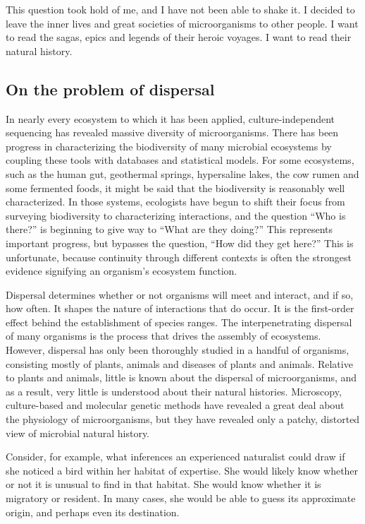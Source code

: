 This question took hold of me, and I have not been able to shake it. I decided to leave the inner lives and great societies of microorganisms to other people. I want to read the sagas, epics and legends of their heroic voyages. I want to read their natural history.

\subsection*{On the problem of dispersal}

In nearly every ecosystem to which it has been applied, culture-independent sequencing has revealed massive diversity of microorganisms. There has been progress in characterizing the biodiversity of many microbial ecosystems by coupling these tools with databases and statistical models. For some ecosystems, such as the human gut, geothermal springs, hypersaline lakes, the cow rumen and some fermented foods, it might be said that the biodiversity is reasonably well characterized. In those systems, ecologists have begun to shift their focus from surveying biodiversity to characterizing interactions, and the question ``Who is there?'' is beginning to give way to ``What are they doing?'' This represents important progress, but bypasses the question, ``How did they get here?'' This is unfortunate, because continuity through different contexts is often the strongest evidence signifying an organism's ecosystem function.

Dispersal determines whether or not organisms will meet and interact, and if so, how often. It shapes the nature of interactions that do occur. It is the first-order effect behind the establishment of species ranges. The interpenetrating dispersal of many organisms is the process that drives the assembly of ecosystems. However, dispersal has only been thoroughly studied in a handful of organisms, consisting mostly of plants, animals and diseases of plants and animals. Relative to plants and animals, little is known about the dispersal of microorganisms, and as a result, very little is understood about their natural histories. Microscopy, culture-based and molecular genetic methods have revealed a great deal about the physiology of microorganisms, but they have revealed only a patchy, distorted view of microbial natural history.

Consider, for example, what inferences an experienced naturalist could draw if she noticed a bird within her habitat of expertise. She would likely know whether or not it is unusual to find in that habitat. She would know whether it is migratory or resident. In many cases, she would be able to guess its approximate origin, and perhaps even its destination.

